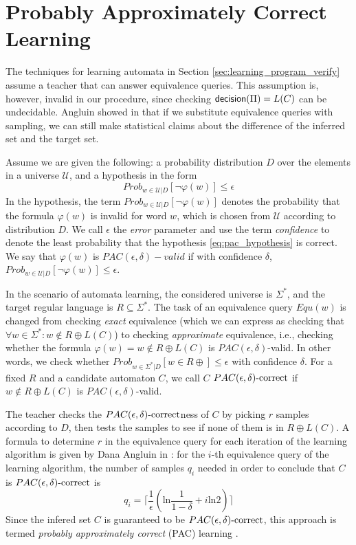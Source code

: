 \section{Probably Approximately Correct Learning}\label{sec:pac_learning}

The techniques for learning automata in Section \ref{sec:learning_program_verify} assume a teacher that can answer equivalence queries. This assumption is, however, invalid in our procedure, since checking $\mathsf{decision}(\Pi) = L(C)$ can be undecidable. Angluin showed in \cite{Angluin88} that if we substitute equivalence queries with sampling, we can still make statistical claims about the difference of the inferred set and the target set. 

Assume we are given the following: a probability distribution $D$ over the elements in a universe $\mathcal{U}$, and a hypothesis in the form
\begin{equation}\label{eq:pac_hypothesis}
	Prob_{w \in \mathcal{U}|D} [\neg \varphi (w)] \leq \epsilon
\end{equation}
In the hypothesis, the term $Prob_{w \in \mathcal{U}|D} [\neg \varphi (w)]$ denotes the probability that the formula $\varphi(w)$ is invalid for word $w$, which is chosen from $\mathcal{U}$ according to distribution $D$. We call $\epsilon$ the \emph{error} parameter and use the term \emph{confidence} to denote the least probability that the hypothesis \ref{eq:pac_hypothesis} is correct. We say that $\varphi(w)$ is \emph{$PAC(\epsilon, \delta)-valid$} if with confidence $\delta$, $Prob_{w \in \mathcal{U}|D} [\neg \varphi (w)] \leq \epsilon$. 

In the scenario of automata learning, the considered universe is $\Sigma^\ast$, and the target regular language is $R \subseteq \Sigma^\ast$. The task of an equivalence query $Equ(w)$ is changed from checking \emph{exact} equivalence (which we can express as checking that $\forall w \in \Sigma^\ast : w \notin R \oplus L(C)$) to checking \emph{approximate} equivalence, i.e., checking whether the formula $\varphi(w) = w \notin R \oplus L(C)$ is $PAC(\epsilon, \delta)$-valid. In other words, we check whether $Prob_{w \in \Sigma^\ast|D} [w \in R \oplus] \leq \epsilon$ with confidence $\delta$. For a fixed $R$ and a candidate automaton $C$, we call $C$ \emph{$PAC(\epsilon, \delta)\text{-correct}$} if $w \notin R \oplus L(C)$ is $PAC(\epsilon, \delta)$-valid.

The teacher checks the $PAC(\epsilon, \delta)\text{-correct}$ness of $C$ by picking $r$ samples according to $D$, then tests the samples to see if none of them is in $R \oplus L(C)$. A formula to determine $r$ in the equivalence query for each iteration of the learning algorithm is given by Dana Angluin in \cite{Angluin87}: for the $i$-th equivalence query of the learning algorithm, the number of samples $q_i$ needed in order to conclude that $C$ is $PAC(\epsilon, \delta)\text{-correct}$ is
\begin{equation}\label{eq:pac_qi}
	q_i = \lceil \frac{1}{\epsilon} (\text{ln} \frac{1}{1-\delta} + i \text{ln}2) \rceil
\end{equation}
Since the infered set $C$ is guaranteed to be $PAC(\epsilon, \delta)\text{-correct}$, this approach is termed \emph{probably approximately correct} (PAC) learning \cite{Valiant84}.